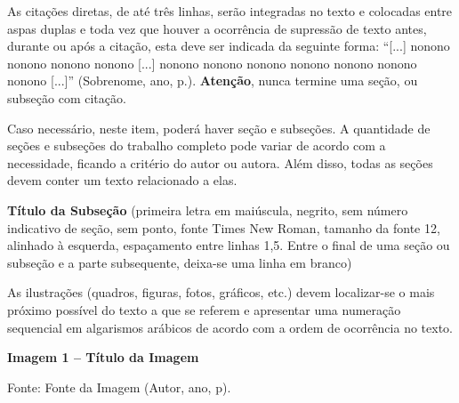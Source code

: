 \bigskip
As citações diretas, de até três linhas, serão integradas no texto e colocadas entre aspas duplas e toda vez que houver a ocorrência de supressão de texto antes, durante ou após a citação, esta deve ser indicada da seguinte forma: ``[...] nonono nonono nonono nonono [...] nonono nonono nonono nonono nonono nonono nonono [...]'' (Sobrenome, ano, p.). \textbf{Atenção}, nunca termine uma seção, ou subseção com citação.

\bigskip

\medskip
Caso necessário, neste item, poderá haver seção e subseções. A quantidade de seções e subseções do trabalho completo pode variar de acordo com a necessidade, ficando a critério do autor ou autora. Além disso, todas as seções devem conter um texto relacionado a elas.

\bigskip
{}

\bigskip
\noindent\textbf{Título da Subseção} {\color{docred}(primeira letra em maiúscula, negrito, sem número indicativo de seção, sem ponto, fonte Times New Roman, tamanho da fonte 12, alinhado à esquerda, espaçamento entre linhas 1,5. Entre o final de uma seção ou subseção e a parte subsequente, deixa-se uma linha em branco)}

\bigskip
As ilustrações (quadros, figuras, fotos, gráficos, etc.) devem localizar-se o mais próximo possível do texto a que se referem e apresentar uma numeração sequencial em algarismos arábicos de acordo com a ordem de ocorrência no texto.

\bigskip
\noindent\hspace*{1.25cm}\textbf{Imagem 1 -- Título da Imagem}

\medskip
\begin{center}
\end{center}

\medskip
\noindent Fonte: Fonte da Imagem (Autor, ano, p).

